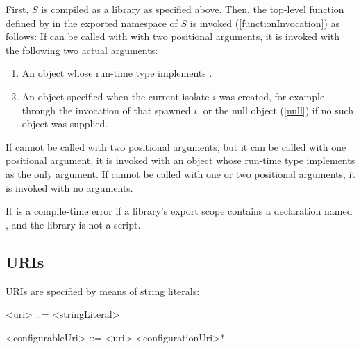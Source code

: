 \documentclass[makeidx]{article}
\begin{document}
{\LMHash{}%
First, $S$ is compiled as a library as specified above.
Then, the top-level function defined by 
in the exported namespace of $S$ is invoked (\ref{functionInvocation})
as follows:
If  can be called with with two positional arguments,
it is invoked with the following two actual arguments:
\begin{enumerate}
\item An object whose run-time type implements .
\item An object specified when the current isolate $i$ was created,
for example through the invocation of  that spawned $i$,
or the null object (\ref{null}) if no such object was supplied.
\end{enumerate}
If  cannot be called with two positional arguments,
but it can be called with one positional argument,
it is invoked with an object whose run-time type implements 
as the only argument.
If  cannot be called with one or two positional arguments,
it is invoked with no arguments.



\LMHash{}%
It is a compile-time error if a library's export scope contains a declaration
named , and the library is not a script.


\subsection{URIs}

\LMHash{}%
URIs are specified by means of string literals:

\begin{grammar}
<uri> ::= <stringLiteral>

<configurableUri> ::= <uri> <configurationUri>*


\end{grammar}}
\end{document}
